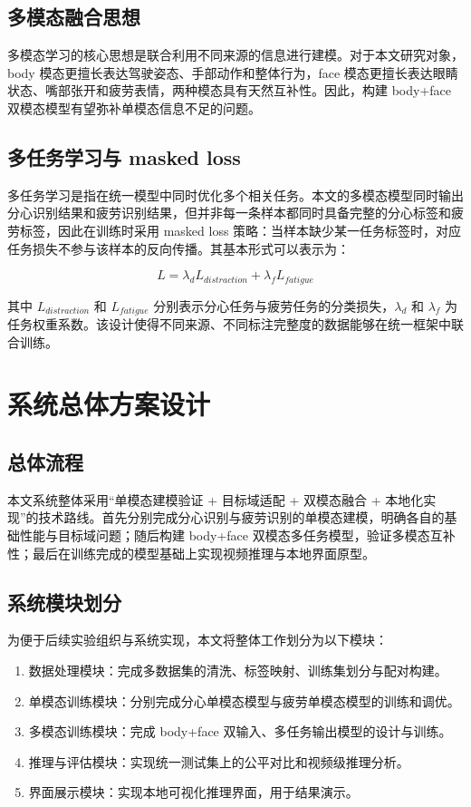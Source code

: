 \documentclass[12pt]{ctexrep}
\begin{document}
\section{多模态融合思想}
多模态学习的核心思想是联合利用不同来源的信息进行建模。对于本文研究对象，body 模态更擅长表达驾驶姿态、手部动作和整体行为，face 模态更擅长表达眼睛状态、嘴部张开和疲劳表情，两种模态具有天然互补性。因此，构建 body+face 双模态模型有望弥补单模态信息不足的问题。

\section{多任务学习与 masked loss}
多任务学习是指在统一模型中同时优化多个相关任务。本文的多模态模型同时输出分心识别结果和疲劳识别结果，但并非每一条样本都同时具备完整的分心标签和疲劳标签，因此在训练时采用 masked loss 策略：当样本缺少某一任务标签时，对应任务损失不参与该样本的反向传播。其基本形式可以表示为：

\begin{equation}
L = \lambda_d L_{distraction} + \lambda_f L_{fatigue}
\end{equation}

其中 $L_{distraction}$ 和 $L_{fatigue}$ 分别表示分心任务与疲劳任务的分类损失，$\lambda_d$ 和 $\lambda_f$ 为任务权重系数。该设计使得不同来源、不同标注完整度的数据能够在统一框架中联合训练。

\chapter{系统总体方案设计}

\section{总体流程}
本文系统整体采用“单模态建模验证 + 目标域适配 + 双模态融合 + 本地化实现”的技术路线。首先分别完成分心识别与疲劳识别的单模态建模，明确各自的基础性能与目标域问题；随后构建 body+face 双模态多任务模型，验证多模态互补性；最后在训练完成的模型基础上实现视频推理与本地界面原型。

\section{系统模块划分}
为便于后续实验组织与系统实现，本文将整体工作划分为以下模块：

\begin{enumerate}
    \item 数据处理模块：完成多数据集的清洗、标签映射、训练集划分与配对构建。
    \item 单模态训练模块：分别完成分心单模态模型与疲劳单模态模型的训练和调优。
    \item 多模态训练模块：完成 body+face 双输入、多任务输出模型的设计与训练。
    \item 推理与评估模块：实现统一测试集上的公平对比和视频级推理分析。
    \item 界面展示模块：实现本地可视化推理界面，用于结果演示。
\end{enumerate}
\end{document}
